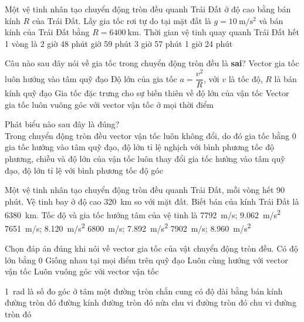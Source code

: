 \begin{ex}
	Một vệ tinh nhân tạo chuyển động tròn đều quanh Trái Đất ở độ cao bằng bán kính $R$ của Trái Đất. Lấy gia tốc rơi tự do tại mặt đất là $g=\SI{10}{\meter/\second^2}$ và bán kính của Trái Đất bằng $R=\SI{6400}{\kilo\meter}$. Thời gian vệ tinh quay quanh Trái Đất hết 1 vòng là
	\choice
	{2 giờ 48 phút}
	{ giờ 59 phút}
	{3 giờ 57 phút}
	{1 giờ 24 phút}
	\loigiai{}
\end{ex}
\begin{ex}
	Câu nào sau đây nói về gia tốc trong chuyển động tròn đều là \textbf{sai}?
	\choice
	{Vector gia tốc luôn hướng vào tâm quỹ đạo}
	{Độ lớn của gia tốc $a=\dfrac{v^2}{R}$, với $v$ là tốc độ, $R$ là bán kính quỹ đạo}
	{\True Gia tốc đặc trưng cho sự biến thiên về độ lớn của vận tốc}
	{Vector gia tốc luôn vuông góc với vector vận tốc ở mọi thời điểm}
	\loigiai{}
\end{ex}
\begin{ex}
	Phát biểu nào sau đây là đúng?\\
	Trong chuyển động tròn đều
	\choice
	{vector vận tốc luôn không đổi, do đó gia tốc bằng 0}
	{gia tốc hướng vào tâm quỹ đạo, độ lớn tỉ lệ nghịch với bình phương tốc độ}
	{phương, chiều và độ lớn của vận tốc luôn thay đổi}
	{\True gia tốc hướng vào tâm quỹ đạo, độ lớn tỉ lệ với bình phương tốc độ góc}
	\loigiai{}
\end{ex}
\begin{ex}
	Một vệ tinh nhân tạo chuyển động tròn đều quanh Trái Đất, mỗi vòng hết 90 phút. Vệ tinh bay ở độ cao \SI{320}{\kilo\meter} so với mặt đất. Biết bán của kính Trái Đất là \SI{6380}{\kilo\meter}. Tốc độ và gia tốc hướng tâm của vệ tinh là
	\choice
	{\True \SI{7792}{\meter/\second}; \SI{9.062}{\meter/\second^2}}
	{\SI{7651}{\meter/\second}; \SI{8.120}{\meter/\second^2}}
	{\SI{6800}{\meter/\second}; \SI{7.892}{\meter/\second^2}}
	{\SI{7902}{\meter/\second}; \SI{8.960}{\meter/\second^2}}
	\loigiai{}
\end{ex}
\begin{ex}
	Chọn đáp án đúng khi nói về vector gia tốc của vật chuyển động tròn đều.
	\choice
	{Có độ lớn bằng 0}
	{Giống nhau tại mọi điểm trên quỹ đạo}
	{Luôn cùng hướng với vector vận tốc}
	{\True Luôn vuông góc với vector vận tốc}
	\loigiai{}
\end{ex}
\begin{ex}
	\SI{1}{\radian} là số đo góc ở tâm một đường tròn chắn cung có độ dài bằng
	\choice
	{\True bán kính đường tròn đó}
	{đường kính đường tròn đó}
	{nửa chu vi đường tròn đó}
	{chu vi đường tròn đó}
	\loigiai{}
\end{ex}


